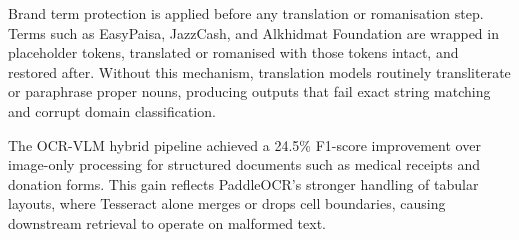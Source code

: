 Brand term protection is applied before any translation or romanisation step. 
Terms such as EasyPaisa, JazzCash, and Alkhidmat Foundation are wrapped in 
placeholder tokens, translated or romanised with those tokens intact, and 
restored after. Without this mechanism, translation models routinely 
transliterate or paraphrase proper nouns, producing outputs that fail exact 
string matching and corrupt domain classification.

The OCR-VLM hybrid pipeline achieved a 24.5\% F1-score improvement over 
image-only processing for structured documents such as medical receipts and 
donation forms. This gain reflects PaddleOCR's stronger handling of tabular 
layouts, where Tesseract alone merges or drops cell boundaries, causing 
downstream retrieval to operate on malformed text.